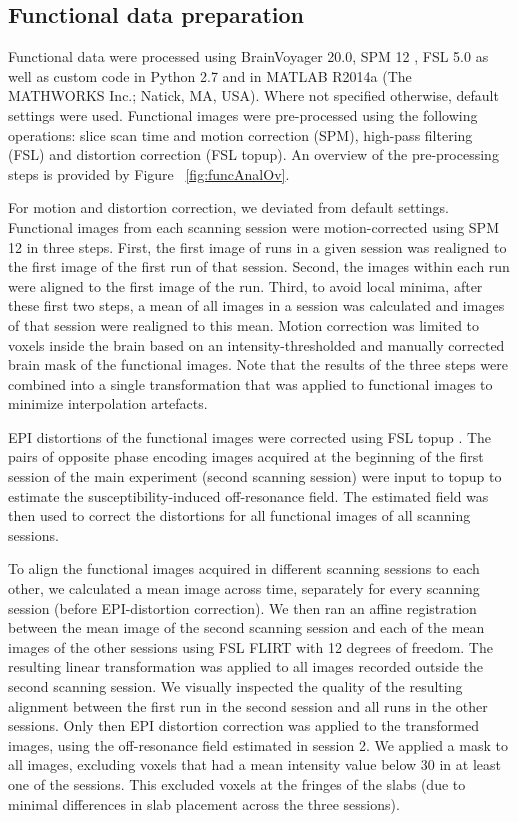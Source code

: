 \subsection{Functional data preparation}
Functional data were processed using BrainVoyager 20.0, SPM 12 \parencite{Friston2006}, FSL 5.0 \parencite{Jenkinson2012} as well as custom code in Python 2.7 \parencite{numpy2011, scipy2001, matplotlib2007} and in MATLAB R2014a (The MATHWORKS Inc.; Natick, MA, USA). Where not specified otherwise, default settings were used. Functional images were pre-processed using the following operations: slice scan time and motion correction (SPM), high-pass filtering (FSL) and distortion correction (FSL topup). An overview of the pre-processing steps is provided by Figure ~\ref{fig:funcAnalOv}.

For motion and distortion correction, we deviated from default settings. Functional images from each scanning session were motion-corrected using SPM 12 in three steps. First, the first image of runs in a given session was realigned to the first image of the first run of that session. Second, the images within each run were aligned to the first image of the run. Third, to avoid local minima, after these first two steps, a mean of all images in a session was calculated and images of that session were realigned to this mean. Motion correction was limited to voxels inside the brain based on an intensity-thresholded and manually corrected brain mask of the functional images. Note that the results of the three steps were combined into a single transformation that was applied to functional images to minimize interpolation artefacts.

EPI distortions of the functional images were corrected using FSL topup \parencite{Andersson2003, Smith2004}. The pairs of opposite phase encoding images acquired at the beginning of the first session of the main experiment (second scanning session) were input to topup to estimate the susceptibility-induced off-resonance field. The estimated field was then used to correct the distortions for all functional images of all scanning sessions.

To align the functional images acquired in different scanning sessions to each other, we calculated a mean image across time, separately for every scanning session (before EPI-distortion correction). We then ran an affine registration between the mean image of the second scanning session and each of the mean images of the other sessions using FSL FLIRT \parencite{Jenkinson2001, Jenkinson2002} with 12 degrees of freedom. The resulting linear transformation was applied to all images recorded outside the second scanning session. We visually inspected the quality of the resulting alignment between the first run in the second session and all runs in the other sessions. Only then EPI distortion correction was applied to the transformed images, using the off-resonance field estimated in session 2. We applied a mask to all images, excluding voxels that had a mean intensity value below 30 in at least one of the sessions. This excluded voxels at the fringes of the slabs (due to minimal differences in slab placement across the three sessions).

